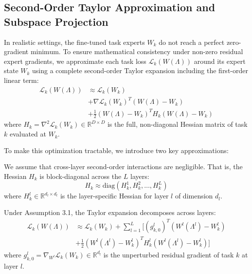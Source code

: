 \subsection{Second-Order Taylor Approximation and Subspace Projection}
In realistic settings, the fine-tuned task experts $W_k$ do not reach a perfect zero-gradient minimum. To ensure mathematical consistency under non-zero residual expert gradients, we approximate each task loss $\mathcal{L}_k(W(\Lambda))$ around its expert state $W_k$ using a complete second-order Taylor expansion including the first-order linear term:
\begin{equation}
\begin{split}
    \mathcal{L}_k(W(\Lambda)) &\approx \mathcal{L}_k(W_k) \\
    &+ \nabla \mathcal{L}_k(W_k)^T (W(\Lambda) - W_k) \\
    &+ \frac{1}{2} (W(\Lambda) - W_k)^T H_k (W(\Lambda) - W_k)
\end{split}
\end{equation}
where $H_k = \nabla^2 \mathcal{L}_k(W_k) \in \mathbb{R}^{D \times D}$ is the full, non-diagonal Hessian matrix of task $k$ evaluated at $W_k$.

To make this optimization tractable, we introduce two key approximations:
\begin{assumption}
    We assume that cross-layer second-order interactions are negligible. That is, the Hessian $H_k$ is block-diagonal across the $L$ layers:
    \begin{equation}
        H_k \approx \text{diag}\left(H_k^1, H_k^2, \dots, H_k^L\right)
    \end{equation}
    where $H_k^l \in \mathbb{R}^{d_l \times d_l}$ is the layer-specific Hessian for layer $l$ of dimension $d_l$.
\end{assumption}

Under Assumption 3.1, the Taylor expansion decomposes across layers:
\begin{equation}
\begin{split}
    \mathcal{L}_k(W(\Lambda)) &\approx \mathcal{L}_k(W_k) + \sum_{l=1}^L \Big[ (g_{k,0}^l)^T (W^l(\Lambda^l) - W_k^l) \\
    &+ \frac{1}{2} \left(W^l(\Lambda^l) - W_k^l\right)^T H_k^l \left(W^l(\Lambda^l) - W_k^l\right) \Big]
\end{split}
\end{equation}
where $g_{k,0}^l = \nabla_{W^l} \mathcal{L}_k(W_k) \in \mathbb{R}^{d_l}$ is the unperturbed residual gradient of task $k$ at layer $l$.

